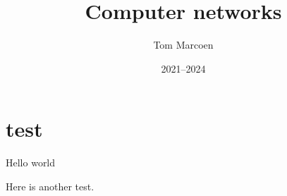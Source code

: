 \title{Computer networks}
\def\subtitle{A brief introduction}
\author{Tom Marcoen}
\date{2021--2024}






   

   \frontmatter
   \clearforchapter
   \tableofcontents*
   \clearforchapter
   \listoffigures
   \clearforchapter
   \listoftables
   
   \printglossary[type=abbreviations,style=mcolindexgroup]
   

   \mainmatter
   \chapter{test}
   Hello world


   Here is another test.

